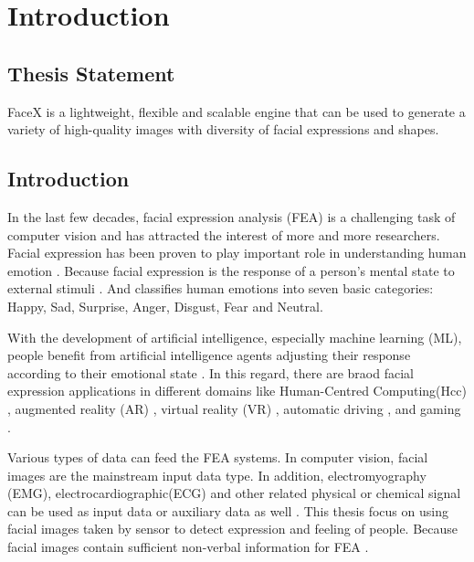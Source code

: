 \chapter{Introduction}
\label{cha:intro}


\section{Thesis Statement}
\label{sec:thesisstatement}
FaceX is a lightweight, flexible and scalable engine that can be used to generate a variety of high-quality images with diversity of facial expressions and shapes. 


\section{Introduction}
\label{sec:problemstatement}

In the last few decades, facial expression analysis (FEA) is a challenging task of computer vision and has attracted the interest of more and more researchers. Facial expression has been proven to play important role in understanding human emotion \citep{Mehrabian_Russell_1974}. Because facial expression is the response of a person's mental state to external stimuli \citep{Cabanac_2002}. And \citeauthor{ekmanArgumentBasicEmotions1992} classifies human emotions into seven basic categories: Happy, Sad, Surprise, Anger, Disgust, Fear and Neutral.

With the development of artificial intelligence, especially machine learning (ML), people benefit from artificial intelligence agents adjusting their response according to their emotional state \citep{adolphsInvestigatingEmotionsFunctional2018}. In this regard, 
there are braod facial expression applications in different domains like Human-Centred Computing(Hcc) \citep{cowieEmotionRecognitionHumancomputer2001}, augmented reality (AR) \citep{chenAugmentedRealitybasedSelffacial2015}, virtual reality (VR) \citep{bekeleUnderstandingHowAdolescents2013}, automatic driving \citep{jabonFacialExpressionAnalysis2011}, and gaming \citep{lankesFacialExpressionsGame2008}. 

Various types of data can feed the FEA systems. In computer vision, facial images are the mainstream input data type. In addition, electromyography (EMG), electrocardiographic(ECG) and other related physical or chemical signal can be used as input data or auxiliary data as well \citep{jerrittaPhysiologicalSignalsBased2011}. This thesis focus on using facial images taken by sensor to detect expression and feeling of people. Because facial images contain sufficient non-verbal information for FEA \citep{huangFacialExpressionRecognition2019}. 

